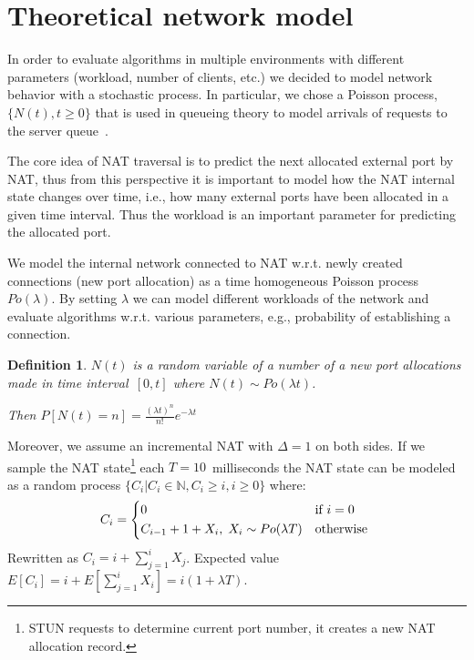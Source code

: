 \documentclass{llncs}
\newtheorem{mydef}{Definition}
\begin{document}

\section{Theoretical network model}
In order to evaluate algorithms in multiple environments with different parameters (workload, number of clients, etc.)
we decided to model network behavior with a stochastic process. In particular, we chose a Poisson process, $\{N(t), t\geq0\}$ 
that is used in queueing theory to model arrivals of requests to the server queue~\citep{Nelson:1995:PSP:207382}. 

The core idea of NAT traversal is to predict the next allocated external port by NAT, thus from this perspective 
it is important to model how the NAT internal state changes over time, i.e., how many external ports 
have been allocated in a given time interval. Thus the workload is an important parameter for predicting the allocated port.

We model the internal network connected to NAT w.r.t. newly created connections (new port allocation) as a 
time homogeneous Poisson process $Po(\lambda)$. By setting $\lambda$ we can model 
different workloads of the network and evaluate algorithms w.r.t. various parameters, e.g., 
probability of establishing a connection. 


\begin{mydef}
$N(t)$ is a random variable of a number of a new port allocations made in time 
interval~$[0,t]$ where $N(t) \sim Po(\lambda t)$. \\ 
                                                      
\begin{center}                                                     
Then $P[N(t)=n] = \frac{(\lambda t)^n}{n!} e^{-\lambda t}$
\end{center}
\end{mydef}

Moreover, we assume an incremental NAT with $\Delta=1$ on both sides. If we sample the NAT 
state\footnote{STUN requests to determine current port number, it creates a new NAT allocation record.}
each $T=10$~milliseconds the NAT state can be modeled as a random process $\{C_i | C_i \in \mathbb{N}, C_i \geq i, i\geq0\}$ where:
\[
C_i = \begin{dcases*}
         0 & if $i=0$ \\
         C_{i-1} + 1 + X_i, \; X_i \sim Po(\lambda T) & otherwise 
        \end{dcases*}
\]
Rewritten as $C_i = i + \sum_{j=1}^{i}X_j$. Expected value $E[C_i] = i + E[\sum_{j=1}^{i}X_i] = i (1+\lambda T)$.
\end{document}
